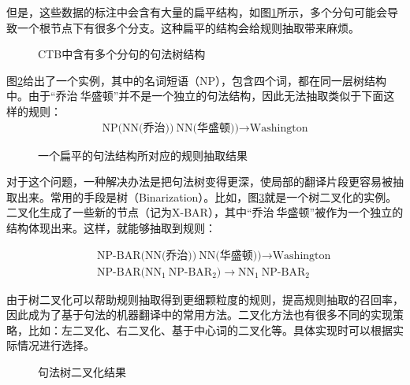 \parinterval 但是，这些数据的标注中会含有大量的扁平结构，如图\ref{fig:8-31}所示，多个分句可能会导致一个根节点下有很多个分支。这种扁平的结构会给规则抽取带来麻烦。

\begin{figure}[htp]
\centering

\caption{CTB中含有多个分句的句法树结构}
\label{fig:8-31}
\end{figure}

\parinterval 图\ref{fig:8-32}给出了一个实例，其中的名词短语（NP），包含四个词，都在同一层树结构中。由于“乔治$\ $华盛顿”并不是一个独立的句法结构，因此无法抽取类似于下面这样的规则：
\begin{eqnarray}
\textrm{NP(NN(乔治))}\ \textrm{NN(华盛顿))} \rightarrow \textrm{Washington} \nonumber
\end{eqnarray}


\begin{figure}[htp]
\centering

\caption{一个扁平的句法结构所对应的规则抽取结果}
\label{fig:8-32}
\end{figure}

\parinterval 对于这个问题，一种解决办法是把句法树变得更深，使局部的翻译片段更容易被抽取出来。常用的手段是树{\small{}}（Binarization）。比如，图\ref{fig:8-33}就是一个树二叉化的实例。二叉化生成了一些新的节点（记为X-BAR），其中“乔治$\ $华盛顿”被作为一个独立的结构体现出来。这样，就能够抽取到规则：

\begin{eqnarray}
&& \textrm{NP-BAR(NN(乔治))}\ \textrm{NN(华盛顿))} \rightarrow \textrm{Washington} \nonumber \\
&& \textrm{NP-BAR(}\textrm{NN}_1\ \textrm{NP-}\textrm{BAR}_2) \rightarrow \textrm{NN}_1\ \textrm{NP-}\textrm{BAR}_2 \nonumber
\end{eqnarray}

\parinterval 由于树二叉化可以帮助规则抽取得到更细颗粒度的规则，提高规则抽取的召回率，因此成为了基于句法的机器翻译中的常用方法。二叉化方法也有很多不同的实现策略，比如：左二叉化、右二叉化、基于中心词的二叉化等。具体实现时可以根据实际情况进行选择。

\begin{figure}[htp]
\centering

\caption{句法树二叉化结果}
\label{fig:8-33}
\end{figure}

